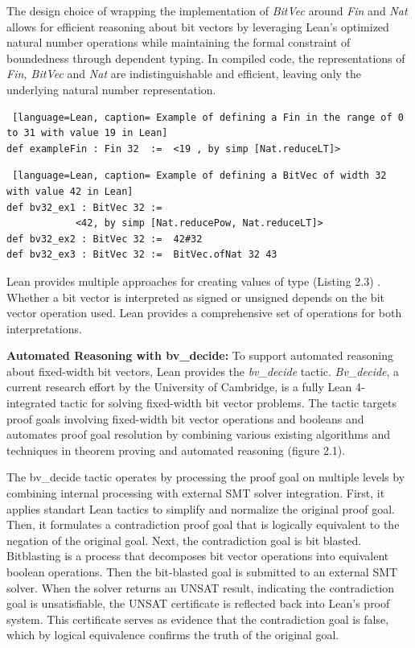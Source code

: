  The design choice of wrapping the implementation of \textit{BitVec} around \textit{Fin} and \textit{Nat} allows for efficient reasoning about bit vectors by leveraging Lean's optimized natural number operations while maintaining the formal constraint of boundedness through dependent typing.
In compiled code, the representations of \textit{Fin, BitVec}  and \textit{Nat} are indistinguishable and efficient, leaving only the underlying natural number representation.

\noindent
\begin{lstlisting} [language=Lean, caption= Example of defining a Fin in the range of 0 to 31 with value 19 in Lean]
def exampleFin : Fin 32  :=  <19 , by simp [Nat.reduceLT]>
\end{lstlisting}
\begin{lstlisting} [language=Lean, caption= Example of defining a BitVec of width 32 with value 42 in Lean]
def bv32_ex1 : BitVec 32 :=  
            <42, by simp [Nat.reducePow, Nat.reduceLT]>
def bv32_ex2 : BitVec 32 :=  42#32
def bv32_ex3 : BitVec 32 :=  BitVec.ofNat 32 43 
\end{lstlisting}
 Lean provides multiple approaches for creating values of type  (Listing 2.3) . Whether a bit vector is interpreted as signed or unsigned depends on the bit vector operation used. Lean provides a comprehensive set of operations for both interpretations.

\textbf{Automated Reasoning with bv\_decide:}
To support automated reasoning about fixed-width bit vectors, Lean provides the \textit{bv\_decide} tactic. \textit{Bv\_decide}, a current research effort by the University of Cambridge, is a fully Lean 4-integrated tactic for solving fixed-width bit vector problems. The tactic targets proof goals involving fixed-width bit vector operations and booleans and automates proof goal resolution by combining various existing algorithms and techniques in theorem proving and automated reasoning (figure 2.1).

The bv\_decide tactic operates by processing the proof goal on multiple levels by combining internal processing with external  SMT solver integration. First, it applies standart Lean tactics to simplify and normalize the original proof goal. Then, it formulates a contradiction proof goal that is logically equivalent to the negation of the original goal. Next, the contradiction goal is bit blasted. Bitblasting is a process that decomposes bit vector operations into equivalent boolean operations. Then the bit-blasted goal is submitted to an external SMT solver. When the solver returns an UNSAT result, indicating the contradiction goal is unsatisfiable, the UNSAT certificate is reflected back into Lean's proof system. This certificate serves as evidence that the contradiction goal is false, which by logical equivalence confirms the truth of the original goal.

